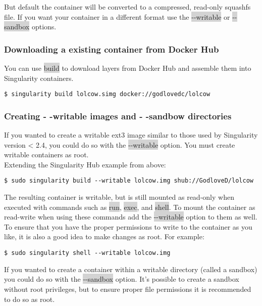 \documentclass[a4paper]{article}
\newcounter{subsubsubsection}[subsubsection]
\begin{document}
But default the container will be converted to a compressed, read-only squashfs file. If you want your container in a different format use the \colorbox{lightgray}{-{}-writable} or \colorbox{lightgray}{-{}-sandbox} options.


\subsubsection{Downloading a existing container from Docker Hub}

You can use \colorbox{lightgray}{build} to download layers from Docker Hub and assemble them into Singularity containers.
\begin{lstlisting}[frame=single]  
$ singularity build lolcow.simg docker://godlovedc/lolcow
\end{lstlisting}
\subsubsection{Creating - -writable images and - -sandbow directories}
	
	If you wanted to create a writable ext3 image similar to those used by Singularity version < 2.4, you could do so with the \colorbox{lightgray}{-{}-writable} option. You must create writable containers as root.
\\[0.1in]
Extending the Singularity Hub example from above:	
\begin{lstlisting}[frame=single]  
$ sudo singularity build --writable lolcow.img shub://GodloveD/lolcow
\end{lstlisting}

	
	The resulting container is writable, but is still mounted as read-only when executed with commands such as \colorbox{lightgray}{run}, \colorbox{lightgray}{exec}, and \colorbox{lightgray}{shell}. To mount the container as read-write when using these commands add the \colorbox{lightgray}{-{}-writable} option to them as well.\\[0.1in]
	To ensure that you have the proper permissions to write to the container as you like, it is also a good idea to make changes as root. For example:
\begin{lstlisting}[frame=single]  
$ sudo singularity shell --writable lolcow.img
\end{lstlisting}	 
	
	If you wanted to create a container within a writable directory (called a sandbox) you could do so with the \colorbox{lightgray}{-{}-sandbox} option. It’s possible to create a sandbox without root privileges, but to ensure proper file permissions it is recommended to do so as root.
	
\end{document}
